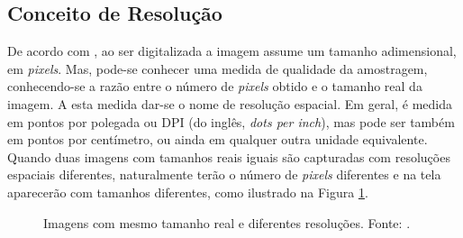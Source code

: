 \subsection{Conceito de Resolução} 
\label{resolucao}


De acordo com \cite{scuri1999fundamentos}, ao ser digitalizada a imagem assume um tamanho adimensional, em \textit{pixels}. Mas, pode-se conhecer uma medida de qualidade da amostragem, conhecendo-se a razão entre o número de \textit{pixels} obtido e o tamanho real da imagem. A esta medida dar-se o nome de resolução espacial. Em geral, é medida em pontos por polegada ou DPI (do inglês, \textit{dots per inch}), mas pode ser também em pontos por centímetro, ou ainda em qualquer outra unidade equivalente. Quando duas imagens com tamanhos reais iguais são capturadas com resoluções espaciais diferentes, naturalmente terão o número de \textit{pixels} diferentes e na tela aparecerão com tamanhos diferentes, como ilustrado na Figura \ref{fig:res1}.

\begin{figure}[h]
    \centering
    \qquad
    \caption{Imagens com mesmo tamanho real e diferentes resoluções. Fonte: \cite{scuri1999fundamentos}.}%
	    \label{fig:res1}
\end{figure}

